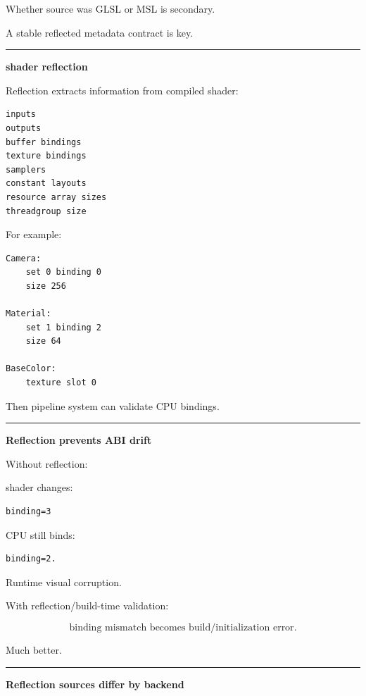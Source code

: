 Whether source was GLSL or MSL is secondary.

A stable reflected metadata contract is key.

\begin{center}\rule{0.5\linewidth}{0.5pt}\end{center}

\textbf{shader reflection}

Reflection extracts information from compiled shader:

\begin{verbatim}
inputs
outputs
buffer bindings
texture bindings
samplers
constant layouts
resource array sizes
threadgroup size
\end{verbatim}

For example:

\begin{verbatim}
Camera:
    set 0 binding 0
    size 256

Material:
    set 1 binding 2
    size 64

BaseColor:
    texture slot 0
\end{verbatim}

Then pipeline system can validate CPU bindings.

\begin{center}\rule{0.5\linewidth}{0.5pt}\end{center}

\textbf{Reflection prevents ABI drift}

Without reflection:

shader changes:

\begin{verbatim}
binding=3
\end{verbatim}

CPU still binds:

\begin{verbatim}
binding=2.
\end{verbatim}

Runtime visual corruption.

With reflection/build-time validation:

\[
\boxed{
\text{binding mismatch becomes build/initialization error}.
}
\]

Much better.

\begin{center}\rule{0.5\linewidth}{0.5pt}\end{center}

\textbf{Reflection sources differ by backend}

